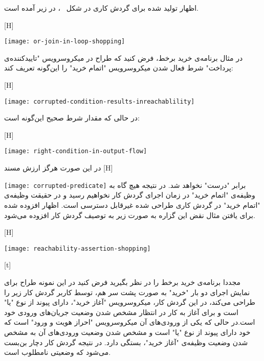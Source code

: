 اظهار تولید شده برای گردش کاری در شکل ~، در زیر آمده است.



[H]
\raggedright
\texttt{[image: or-join-in-loop-shopping]}
\vspace{0.5em}




در مثال برنامه‌ی خرید برخط، فرض کنید که طراح در میکروسرویس "تاییدکننده‌ی پرداخت" شرط فعال شدن میکروسرویس "اتمام خرید" را این‌گونه تعریف کند:


[H]
\raggedright
\texttt{[image: corrupted-condition-results-inreachablility]}
\vspace{0.5em}

در حالی که مقدار شرط صحیح این‌گونه است:



[H]
\raggedright
\texttt{[image: right-condition-in-output-flow]}
\vspace{0.5em}



در این صورت هرگز ارزش مسند 
[H]
\raggedright
\texttt{[image: corrupted-predicate]}
\vspace{0.5em}
برابر "درست" نخواهد شد. در نتیجه هیچ گاه به وظیفه‌ی "اتمام خرید" در زمان اجرای گردش کار نخواهیم رسید و در حقیقت وظیفه‌ی "اتمام خرید" در گردش کاری طراحی شده غیرقابل دسترسی است. اظهار افزوده شده برای یافتن مثال نقض این گزاره به صورت زیر به توصیف گردش کار افزوده می‌شود. \newline\newline



[H]
\raggedright
\texttt{[image: reachability-assertion-shopping]}
\vspace{0.5em}
 

 [t]
\raggedright
{}
\vspace{0.5em}
 مجددا برنامه‌ی خرید برخط را در نظر بگیرید فرض کنید در این نمونه طراح برای نمایش اجرای دو بار "خرید" به صورت پشت سر هم، توسط کاربر گردش کار زیر را طراحی می‌کند، در این گردش کار، میکروسرویس "آغاز خرید"، دارای پیوند از نوع "یا" است و برای آغاز به کار در انتظار مشخص شدن وضعیت جریان‌های ورودی خود است.در حالی که یکی از ورودی‌های آن میکروسرویس "احراز هویت و ورود" است که خود دارای پیوند از نوع "یا" است و مشخص شدن وضعیت ورودی‌های آن به مشخص شدن وضعیت وظیفه‌ی "آغاز خرید"، بستگی دارد. در نتیجه گردش کار دچار بن‌بست می‌شود که وضعیتی نامطلوب است.


